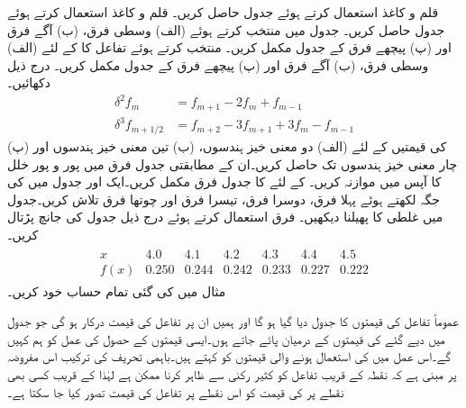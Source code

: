 
\quad
قلم و کاغذ استعمال کرتے ہوئے جدول  حاصل کریں۔
\quad
قلم و کاغذ استعمال کرتے ہوئے جدول  حاصل کریں۔
\quad
جدول  میں  منتخب کرتے ہوئے (الف) وسطی فرق، (ب) آگے فرق اور (پ) پیچھے فرق کے جدول مکمل کریں۔
\quad
{} منتخب کرتے ہوئے تفاعل  کا  کے لئے   (الف) وسطی فرق، (ب) آگے فرق اور (پ) پیچھے فرق کے جدول مکمل کریں۔
\quad
درج ذیل دکھائیں۔
\begin{align*}
\delta^2 f_m&=f_{m+1}-2f_m+f_{m-1}\\
\delta^3 f_{m+1/2}&=f_{m+2}-3f_{m+1}+3f_m-f_{m-1}
\end{align*}
\quad
{} کی قیمتیں  کے لئے (الف) دو معنی خیز ہندسوں، (ب) تین معنی خیز ہندسوں اور (پ) چار معنی خیز ہندسوں تک حاصل کریں۔ان کے مطابقتی جدول فرق میں پور و پور خلل کا آپس میں موازنہ کریں۔ 
\quad
{} کے لئے  کا جدول فرق مکمل کریں۔ایک اور جدول میں  کی جگہ  لکھتے ہوئے پہلا فرق، دوسرا فرق، تیسرا فرق اور چوتھا فرق تلاش کریں۔جدول میں غلطی کا پھیلنا دیکھیں۔  
\quad
فرق استعمال کرتے ہوئے درج ذیل جدول کی جانچ پڑتال کریں۔
\begin{align*}
\begin{array}{c|cccccc}
x&4.0&4.1&4.2&4.3&4.4&4.5\\
\hline
f(x)&0.250&0.244&0.242&0.233&0.227&0.222
\end{array}
\end{align*}
\quad
مثال  میں کی گئی  تمام حساب خود کریں۔  

عموماً تفاعل  کی قیمتوں کا جدول دیا گیا ہو گا اور ہمیں ان  پر تفاعل کی قیمت درکار ہو گی جو جدول میں دیے گئے  کی قیمتوں کے درمیان پائے جاتے ہوں۔ایسی قیمتوں کے حصول کی عمل کو ہم  کہیں گے۔اس عمل میں  کی استعمال ہونے والی قیمتوں کو  کہتے ہیں۔باہمی تحریف کی ترکیب اس مفروضہ پر مبنی ہے کہ نقطہ  کے قریب تفاعل  کو کثیر رکنی  سے ظاہر کرنا ممکن ہے لہٰذا  کے قریب کسی بھی نقطے پر  کی قیمت کو اس نقطے پر تفاعل کی قیمت تصور کیا جا سکتا ہے۔

